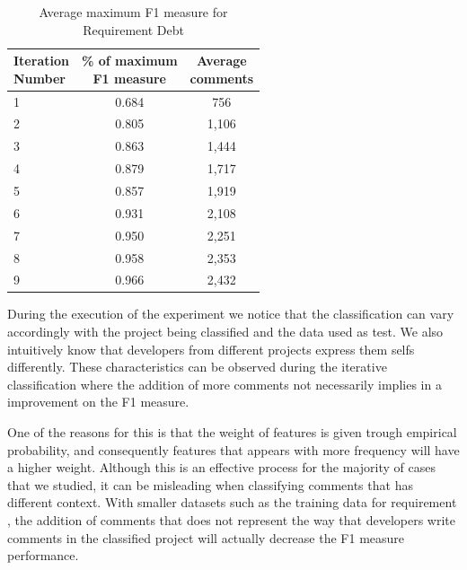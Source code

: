 \begin{table}[!thb]
	\begin{center}
		\caption{Average maximum F1 measure for Requirement Debt}
		\label{tbl:requirement_iteration_performance}
		\begin{tabular}{l| c c }
			\toprule
			\thead{Iteration\\Number} & \thead{\% of maximum\\F1 measure} & \thead{Average\\comments} \\
			\midrule
			1  &  0.684  & 756 \\  
			2  &  0.805  & 1,106 \\  
			3  &  0.863  & 1,444 \\  
			4  &  0.879  & 1,717 \\  
			5  &  0.857  & 1,919 \\  
			6  &  0.931  & 2,108 \\  
			7  &  0.950  & 2,251 \\  
			8  &  0.958  & 2,353 \\  
			9  &  0.966  & 2,432 \\  
			\bottomrule
		\end{tabular}
	\end{center}    
\end{table}

During the execution of the experiment we notice that the classification can vary accordingly with the project being classified and the data used as test. We also intuitively know that developers from different projects express them selfs differently. These characteristics can be observed during the iterative classification where the addition of more comments not necessarily implies in a improvement on the F1 measure.

One of the reasons for this is that the weight of features is given trough empirical probability, and consequently features that appears with more frequency will have a higher weight. Although this is an effective process for the majority of cases that we studied, it can be misleading when classifying comments that has different context. With smaller datasets such as the training data for requirement \SATD, the addition of comments that does not represent the way that developers write comments in the classified project will actually decrease the F1 measure performance. 

